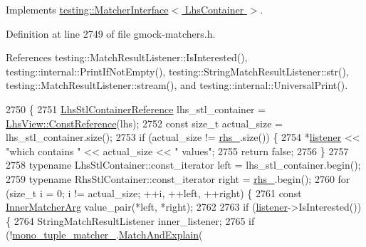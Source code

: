 Implements \hyperlink{classtesting_1_1MatcherInterface_a296b43607cd99d60365f0e6a762777cf}{testing\+::\+Matcher\+Interface$<$ Lhs\+Container $>$}.



Definition at line 2749 of file gmock-\/matchers.\+h.



References testing\+::\+Match\+Result\+Listener\+::\+Is\+Interested(), testing\+::internal\+::\+Print\+If\+Not\+Empty(), testing\+::\+String\+Match\+Result\+Listener\+::str(), testing\+::\+Match\+Result\+Listener\+::stream(), and testing\+::internal\+::\+Universal\+Print().


\begin{DoxyCode}
2750                                                                       \{
2751       \hyperlink{classtesting_1_1internal_1_1PointwiseMatcher_1_1Impl_a9df3eb0866f76d59dbdd35fafeb5590c}{LhsStlContainerReference} lhs\_stl\_container = 
      \hyperlink{classtesting_1_1internal_1_1StlContainerView_a36eccf53329730f6e55c12002128bf25}{LhsView::ConstReference}(lhs);
2752       \textcolor{keyword}{const} \textcolor{keywordtype}{size\_t} actual\_size = lhs\_stl\_container.size();
2753       \textcolor{keywordflow}{if} (actual\_size != \hyperlink{classtesting_1_1internal_1_1PointwiseMatcher_1_1Impl_a7f00c6c50d20c8c274428106b6c8e9ab}{rhs\_}.size()) \{
2754         *\hyperlink{namespaceinteractive__marker_a0e579ab555212bb5e2c9f8a675b7618a}{listener} << \textcolor{stringliteral}{"which contains "} << actual\_size << \textcolor{stringliteral}{" values"};
2755         \textcolor{keywordflow}{return} \textcolor{keyword}{false};
2756       \}
2757 
2758       \textcolor{keyword}{typename} LhsStlContainer::const\_iterator left = lhs\_stl\_container.begin();
2759       \textcolor{keyword}{typename} RhsStlContainer::const\_iterator right = \hyperlink{classtesting_1_1internal_1_1PointwiseMatcher_1_1Impl_a7f00c6c50d20c8c274428106b6c8e9ab}{rhs\_}.begin();
2760       \textcolor{keywordflow}{for} (\textcolor{keywordtype}{size\_t} i = 0; i != actual\_size; ++i, ++left, ++right) \{
2761         \textcolor{keyword}{const} \hyperlink{classtesting_1_1internal_1_1PointwiseMatcher_1_1Impl_aba9d983881cbfbb37724b8b40e863898}{InnerMatcherArg} value\_pair(*left, *right);
2762 
2763         \textcolor{keywordflow}{if} (\hyperlink{namespaceinteractive__marker_a0e579ab555212bb5e2c9f8a675b7618a}{listener}->IsInterested()) \{
2764           StringMatchResultListener inner\_listener;
2765           \textcolor{keywordflow}{if} (!\hyperlink{classtesting_1_1internal_1_1PointwiseMatcher_1_1Impl_ac94a851d56fe3f4f900da94cdc08c973}{mono\_tuple\_matcher\_}.\hyperlink{classtesting_1_1internal_1_1MatcherBase_a08429a6d7e7d330de4a4eb4e272105a7}{MatchAndExplain}(

\end{DoxyCode}

